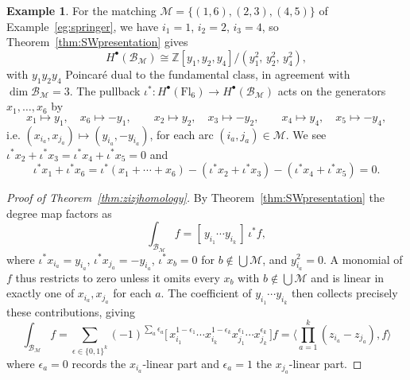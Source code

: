 \documentclass[11pt]{amsart}
\theoremstyle{definition}
\newtheorem{eg}[thm]{Example}
\numberwithin{equation}{section}
\newcommand{\fl}[1]{\mathrm{Fl}_{#1}}
\begin{document}
    \begin{eg}\label{eg:swpresentation}
For the matching $\mathcal{M}=\{(1,6),(2,3),(4,5)\}$ of
Example~\ref{eg:springer}, we have $i_1=1$, $i_2=2$, $i_3=4$, so
Theorem~\ref{thm:SWpresentation} gives
\[
H^\bullet(\mathcal{B}_{\mathcal{M}})\cong \mathbb{Z}[y_1,y_2,y_4]/(y_1^2,\,y_2^2,\,y_4^2),
\]
with $y_1y_2y_4$ Poincar\'e dual to the fundamental class, in agreement with
$\dim \mathcal{B}_{\mathcal{M}}=3$. The pullback $\iota^*\colon H^\bullet(\fl{6})\to
H^\bullet(\mathcal{B}_{\mathcal{M}})$ acts on the generators $x_1,\dots,x_6$ by
\[
x_1\mapsto y_1,\quad x_6\mapsto -y_1,\qquad
x_2\mapsto y_2,\quad x_3\mapsto -y_2,\qquad
x_4\mapsto y_4,\quad x_5\mapsto -y_4,
\]
i.e. $(x_{i_a},x_{j_a})\mapsto (y_{i_a},-y_{i_a})$, for each arc
$(i_a,j_a)\in \mathcal{M}$. We see $\iota^*x_{2}+\iota^*x_{3}=\iota^*x_{4}+\iota^*x_{5}=0$ and
$$\iota^*x_1+\iota^*x_6=\iota^*(x_1+\cdots+x_6)-(\iota^*x_2+\iota^*x_3)-(\iota^*x_4+\iota^*x_5)=0.$$
\end{eg}
\begin{proof}[Proof of Theorem~\ref{thm:zizjhomology}]
    By Theorem~\ref{thm:SWpresentation} the degree map factors as
$$\int_{\mathcal{B}_\mathcal{M}}f=[\,y_{i_1}\cdots y_{i_k}\,]\,\iota^*f,$$
where $\iota^*x_{i_a}=y_{i_a}$, $\iota^*x_{j_a}=-y_{i_a}$, $\iota^*x_b=0$ for
$b\notin\bigcup\mathcal{M}$, and $y_{i_a}^2=0$. A monomial of $f$ thus
restricts to zero unless it omits every $x_b$ with $b\notin\bigcup\mathcal{M}$ and is
linear in exactly one of $x_{i_a},x_{j_a}$ for each $a$.
The coefficient of
$y_{i_1}\cdots y_{i_k}$ then collects precisely these contributions, giving
\begin{equation}\label{eq:signsum}
\int_{\mathcal{B}_\mathcal{M}}f
=\sum_{\epsilon\in\{0,1\}^k}(-1)^{\sum_a\epsilon_a}
\big[\,x_{i_1}^{1-\epsilon_1}\cdots x_{i_k}^{1-\epsilon_k}
x_{j_1}^{\epsilon_1}\cdots x_{j_k}^{\epsilon_k}\,\big]f=\langle \prod_{a=1}^k(z_{i_a}-z_{j_a}),f\rangle
\end{equation}
where $\epsilon_a=0$ records the $x_{i_a}$-linear part and $\epsilon_a=1$ the
$x_{j_a}$-linear part.
\end{proof}
\end{document}
